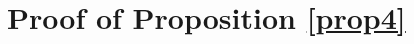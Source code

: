 \documentclass[12pt,reqno]{amsart}
\theoremstyle{plain}
\numberwithin{equation}{section}
\numberwithin{figure}{section}
\theoremstyle{plain}
\theoremstyle{definition}
\theoremstyle{remark}
\newcommand{\mmod}{\,\mathrm{mod}\,}
\begin{document}


  
 \section{Proof of Proposition \ref{prop4}}
\end{document}
